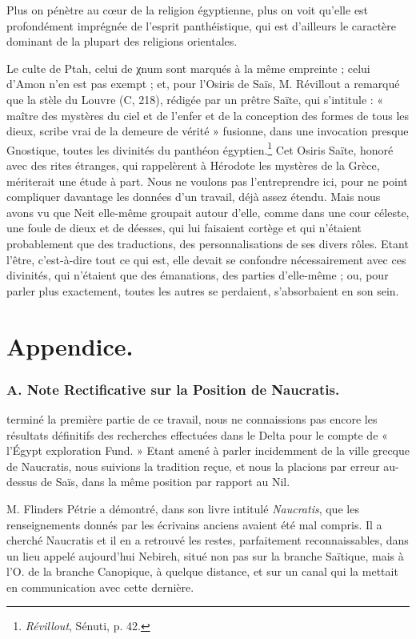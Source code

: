 \documentclass[letterpaper,twocolumn,openany,nodeprecatedcode]{dndbook}
\begin{document}
Plus on pénètre au cœur de la religion égyptienne, plus on voit qu'elle est profondément imprégnée de l'esprit panthéistique, qui est d'ailleurs le caractère dominant de la plupart des religions orientales.

Le culte de Ptah, celui de χnum sont marqués à la même empreinte ; celui d'Amon n'en est pas exempt ; et, pour l'Osiris de Saïs, M. Révillout a remarqué que la stèle du Louvre (C, 218), rédigée par un prêtre Saïte, qui s'intitule : « maître des mystères du ciel et de l'enfer et de la conception des formes de tous les dieux, scribe vrai de la demeure de vérité » fusionne, dans une invocation presque Gnostique, toutes les divinités du panthéon égyptien.\footnote{\emph{Révillout}, Sénuti, p. 42.} Cet Osiris Saïte, honoré avec des rites étranges, qui rappelèrent à Hérodote les mystères de la Grèce, mériterait une étude à part. Nous ne voulons pas l'entreprendre ici, pour ne point compliquer davantage les données d'un travail, déjà assez étendu. Mais nous avons vu que Neit elle-même groupait autour d'elle, comme dans une cour céleste, une foule de dieux et de déesses, qui lui faisaient cortège et qui n'étaient probablement que des traductions, des personnalisations de ses divers rôles. Etant l'être, c'est-à-dire tout ce qui est, elle devait se confondre nécessairement avec ces divinités, qui n'étaient que des émanations, des parties d'elle-même ; ou, pour parler plus exactement, toutes les autres se perdaient, s'absorbaient en son sein.
\clearpage
\part{Appendice.}
\section{A. Note Rectificative sur la Position de Naucratis.}
 terminé la première partie de ce travail, nous ne connaissions pas encore les résultats définitifs des recherches effectuées dans le Delta pour le compte de « l'Égypt exploration Fund. » Etant amené à parler incidemment de la ville grecque de Naucratis, nous suivions la tradition reçue, et nous la placions par erreur au-dessus de Saïs, dans la même position par rapport au Nil.

M. Flinders Pétrie a démontré, dans son livre intitulé \emph{Naucratis}, que les renseignements donnés par les écrivains anciens avaient été mal compris. Il a cherché Naucratis et il en a retrouvé les restes, parfaitement reconnaissables, dans un lieu appelé aujourd'hui Nebireh, situé non pas sur la branche Saïtique, mais à l'O. de la branche Canopique, à quelque distance, et sur un canal qui la mettait en communication avec cette dernière.
\end{document}
